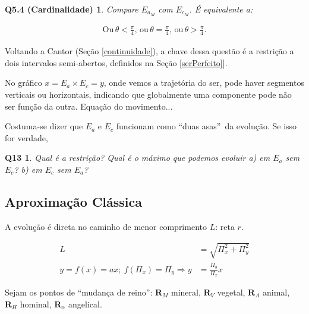 \documentclass[12pt,a4paper]{article}
\begin{document}
			\newtheorem{Q5.4}{Q5.4 (Cardinalidade)}
			\begin{Q5.4} Compare $ E_{a_M} $ com $ E_{c_M} $. \'E equivalente a:
			\end{Q5.4}

			\begin{align*}
				\mathrm{Ou}\,\theta < \frac{\pi}{4}, \,\mathrm{ou}\, \theta = \frac{\pi}{4}, \,\mathrm{ou}\, \theta > \frac{\pi}{4}.
			\end{align*}

			Voltando a Cantor (Se\c{c}\~ao \ref{continuidade}), a chave dessa quest\~ao \'e a restri\c{c}\~ao a dois intervalos semi-abertos, definidos na Se\c{c}\~ao \ref{serPerfeito}].

			No gr\'afico $ x = E_a \times E_c = y $, onde vemos a trajet\'oria do ser, pode haver segmentos verticais ou horizontais, indicando que globalmente uma componente pode n\~ao ser fun\c{c}\~ao da outra. Equa\c{c}\~ao do movimento...

			Costuma-se dizer que $E_a$ e $E_c$ funcionam como \textquotedblleft duas asas\textquotedblright\, da evolu\c{c}\~ao. Se isso for verdade,

			\newtheorem{Q13}{Q13}
			\begin{Q13} Qual \'e a restri\c{c}\~ao? Qual \'e o m\'aximo que podemos evoluir a) em $E_a$ sem $E_c$? b) em $E_c$ sem $E_a$?
			\end{Q13}

		\subsection{Aproxima\c{c}\~ao Cl\'assica}
			\begin{flushright}
			\end{flushright}

			A evolu\c{c}\~ao \'e direta no caminho de menor comprimento $L$: reta $r$.

			\begin{align*}
				L &= \sqrt{\Pi_x^2 + \Pi_y^2} \\
				y = f(x) = ax; \ f\left(\Pi_x\right) = \Pi_y \Rightarrow y &=\frac{\Pi_y}{\Pi_x} x
			\end{align*}

			Sejam os pontos de \textquotedblleft mudan\c{c}a de reino\textquotedblright: $ \mathbf{R}_M $ mineral, $ \mathbf{R}_V $ vegetal, $ \mathbf{R}_A $ animal, $ \mathbf{R}_H $ hominal, $ \mathbf{R}_\alpha $ angelical.
\end{document}
